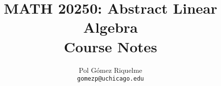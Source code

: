 \documentclass[12pt,oneside]{article}
\begin{document}
\title{
	MATH 20250: Abstract Linear Algebra\\\vspace{0.15in}
    \large{Course Notes}
}
\author{Pol Gómez Riquelme \\ \texttt{gomezp@uchicago.edu}}
\maketitle
\tableofcontents
\pagebreak













\end{document}

